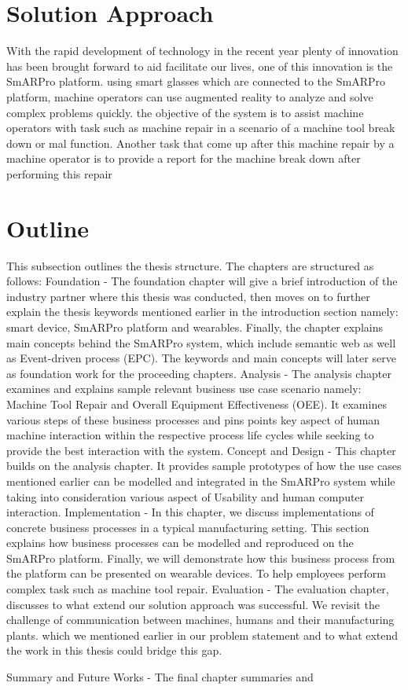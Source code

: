 \section{Solution Approach}
With the rapid development of technology in the recent year plenty of innovation has been brought forward to aid facilitate our lives, one of this innovation is the SmARPro platform. using smart glasses which are connected to the SmARPro platform, machine operators can use augmented reality to analyze and solve complex problems quickly.  the objective of the system is to assist machine operators with task such as machine repair in a scenario of a machine tool break down or mal function. Another task that come up after this machine repair by a machine operator is to provide a report for the machine break down after performing this repair

\section{Outline}

This subsection outlines the thesis structure. The chapters are structured as follows: 
Foundation -	The foundation chapter will give a brief introduction of the industry partner where this thesis was conducted, then moves on to further explain the thesis keywords mentioned earlier in the introduction section namely: smart device, SmARPro platform and wearables. Finally, the chapter explains main concepts behind the SmARPro system, which include semantic web as well as Event-driven process (EPC).   The keywords and main concepts will later serve as foundation work for the proceeding chapters.
Analysis -	The analysis chapter examines and explains sample relevant business use case scenario namely: Machine Tool Repair and Overall Equipment Effectiveness (OEE). It examines various steps of these business processes and pins points key aspect of human machine interaction within the respective process life cycles while seeking to provide the best interaction with the system.
Concept and Design -	This chapter builds on the analysis chapter. It provides sample prototypes of how the use cases mentioned earlier can be modelled and integrated in the SmARPro system while taking into consideration various aspect of Usability and human computer interaction.
Implementation -	In this chapter, we discuss implementations of concrete business processes in a typical manufacturing setting. This section explains how business processes can be modelled and reproduced on the SmARPro platform. Finally, we will demonstrate how this business process from the platform can be presented on wearable devices. To help employees perform complex task such as machine tool repair.
Evaluation -	The evaluation chapter, discusses to what extend our solution approach was successful. We revisit the challenge of communication between machines, humans and their manufacturing plants. which we mentioned earlier in our problem statement and to what extend the work in this thesis could bridge this gap.  

Summary and Future Works -	The final chapter summaries and

